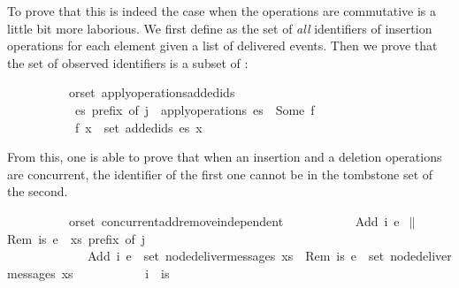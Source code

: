 \noindent To prove that this is indeed the case when the operations are
commutative is a little bit more laborious. We first define  as
the set of \emph{all} identifiers of insertion operations for each element
given a list of delivered events.  Then we prove that the set of observed
identifiers is a subset of :

\vspace{0.375em}
\begin{isabellebody}
\ \ \ \ \ \ \ \ \ {\isacharparenleft}\ orset{\isacharparenright}\ apply{\isacharunderscore}operations{\isacharunderscore}added{\isacharunderscore}ids{\isacharcolon}\isanewline
\ \ \ \ \ \ \ \ \ \ \ {\isachardoublequoteopen}es\ prefix\ of\ j{\isachardoublequoteclose}\ \ {\isachardoublequoteopen}apply{\isacharunderscore}operations\ es\ {\isacharequal}\ Some\ f{\isachardoublequoteclose}\isanewline
\ \ \ \ \ \ \ \ \ \ \ {\isachardoublequoteopen}f\ x\ {\isasymsubseteq}\ set\ {\isacharparenleft}added{\isacharunderscore}ids\ es\ x{\isacharparenright}{\isachardoublequoteclose}
\end{isabellebody}
\vspace{0.375em}

\noindent From this, one is able to prove that when an insertion and a deletion
operations are concurrent, the identifier of the first one cannot be
in the tombstone set of the second.

\vspace{0.375em}
\begin{isabellebody}
\ \ \ \ \ \ \ \ \ {\isacharparenleft}\ orset{\isacharparenright}\ concurrent{\isacharunderscore}add{\isacharunderscore}remove{\isacharunderscore}independent{\isacharcolon}\isanewline
\ \ \ \ \ \ \ \ \ \ \ {\isachardoublequoteopen}{\isacharparenleft}Add\ i\ e{}{\isacharparenright}\ $\|$ {\isacharparenleft}Rem\ is\ e{}{\isacharparenright}{\isachardoublequoteclose}\ \ {\isachardoublequoteopen}xs\ prefix\ of\ j{\isachardoublequoteclose}\isanewline
\ \ \ \ \ \ \ \ \ \ \ \ \ {\isachardoublequoteopen}Add\ i\ e{}\ {\isasymin}\ set\ {\isacharparenleft}node{\isacharunderscore}deliver{\isacharunderscore}messages\ xs{\isacharparenright}{\isachardoublequoteclose}\ \ {\isachardoublequoteopen}Rem\ is\ e{}\ {\isasymin}\ set\ {\isacharparenleft}node{\isacharunderscore}deliver{\isacharunderscore}messages\ xs{\isacharparenright}{\isachardoublequoteclose}\isanewline
\ \ \ \ \ \ \ \ \ \ \ {\isachardoublequoteopen}i\ {\isasymnotin}\ is{\isachardoublequoteclose}
\end{isabellebody}
\vspace{0.375em}


